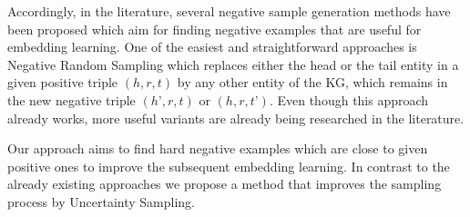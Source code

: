 Accordingly, in the literature, several negative sample generation methods have been proposed which aim for finding negative examples that are useful for embedding learning.
One of the easiest and straightforward approaches is Negative Random Sampling which replaces either the head or the tail entity in a given positive triple $(h, r, t)$ by any other entity of the \ac{KG}, which remains in the new negative triple $(h’,r,t)$ or $(h,r,t’)$. 
Even though this approach already works, more useful variants are already being researched in the literature.

Our approach aims to find hard negative examples which are close to given positive ones to improve the subsequent embedding learning.
In contrast to the already existing approaches we propose a method that improves the sampling process by Uncertainty Sampling.
